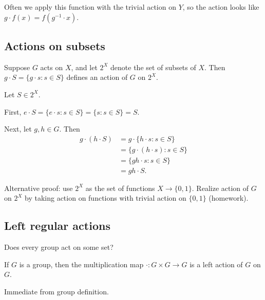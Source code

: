 \documentclass[12pt,letterpaper]{report}
\begin{document}
\begin{thmproof}
\end{thmproof}

Often we apply this function with the trivial action on $Y$, so the action looks like
$g \cdot f(x) = f(g^{-1} \cdot x)$.

\pagebreak
\subsection{Actions on subsets}

\begin{prop}{}{}
  Suppose $G$ acts on $X$, and let $2^X$ denote the set of subsets of $X$.
  Then $g \cdot S = \{g \cdot s : s \in S\}$ defines an action of $G$ on $2^X$.
\end{prop}

\begin{thmproof}
  Let $S \in 2^X$.

  First, $e \cdot S = \{e \cdot s : s \in S\} = \{s : s \in S\} = S$.

  Next, let $g, h \in G$.
  Then
  \begin{align*}
    g \cdot (h \cdot S)
    &= g \cdot \{h \cdot s : s \in S\} \\
    &= \{g \cdot (h \cdot s) : s \in S\} \\
    &= \{gh \cdot s : s \in S\} \\
    &= gh \cdot S.
  \end{align*}
\end{thmproof}

Alternative proof: use $2^X$ as the set of functions $X \to \{0, 1\}$.
Realize action of $G$ on $2^X$ by taking action on functions with trivial action on $\{0, 1\}$
(homework).

\pagebreak
\subsection{Left regular actions}

Does every group act on some set?

\begin{lem}{}{}
  If $G$ is a group, then the multiplication map $\cdot \colon G \times G \to G$ is a left action
  of $G$ on $G$.
\end{lem}

\begin{thmproof}
  Immediate from group definition.
\end{thmproof}
\end{document}
